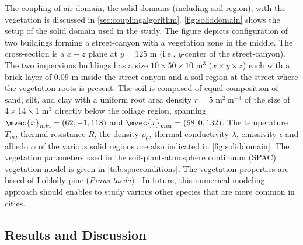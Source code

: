 The coupling of air domain, the solid domains (including soil region), with the vegetation is discussed in \cref{sec:couplingalgorithm}. \cref{fig:soliddomain} shows the setup of the solid domain used in the study. The figure depicts configuration of two buildings forming a street-canyon with a vegetation zone in the middle. The cross-section is a $x-z$ plane at $y=125$ m  (i.e., $y$-center of the street-canyon). The two impervious buildings has a size $10 \times 50 \times 10$ m$^3$ ($x\times y \times z$) each with a brick layer of $0.09$ m inside the street-canyon and a soil region at the street where the vegetation roots is present. The soil is composed of equal composition of sand, silt, and clay with a uniform root area density $r = 5$ m$^{2}$\,m$^{-3}$ of the size of $4 \times 14 \times 1$ m$^{3}$ directly below the foliage region, spanning $\mvec{x}_{\textit{min}} = (62, -1, 118)$ and $\mvec{x}_{\textit{max}} = (68, 0, 132)$. The temperature $T_{\textit{in}}$, thermal resistance $R$, the density $\rho_0$, thermal conductivity $\lambda$, emissivity $\epsilon$ and albedo $\alpha$ of the various solid regions are also indicated in \cref{fig:soliddomain}. The vegetation parameters used in the soil-plant-atmosphere continuum (SPAC) vegetation model is given in \cref{tab:spacconditions}. The vegetation properties are based of Loblolly pine (\textit{Pinus taeda}) \citep{Manoli2014,Volpe2013,Launiainen2015,Manzoni2011,Vogel2016}. In future, this numerical modeling approach should enables to study various other species that are more common in cities.

\subsection{Results and Discussion}




